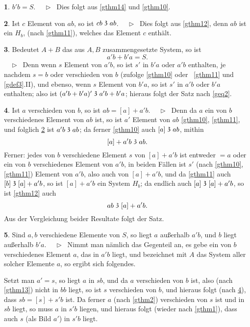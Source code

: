 \documentclass[leqno,hidelinks,10pt]{article}
\theoremstyle{definition}
\newtheorem{satz}{\protect\satzname}
\newcommand{\satzname}{}
\renewcommand{\satzname}{\hspace{-4pt}.\ Satz}%
\renewcommand{\satzname}{\hspace{-4pt}.\ Theorem}%
\newcommand\Beweis{\medskip \newline $ \phantom{'.'} \rhd \ $}%
\newcommand\beweis{ $ \phantom{'.'} \rhd \ $}%
\newcommand\TeilVon{\mathrel{\raisebox{0.45ex}{$\mathfrak{3}$}}}
\newcommand{\sref}[1]{\underline{\ref{#1}}}%
\begin{document}
\begin{paracol}{2}
\begin{leftcolumn}
\begin{satz}\label{gthm15}
$b' b = S$.
\Beweis
Dies folgt aus \sref{gthm14} und \sref{gthm10}.
\end{satz}

\begin{satz}\label{gthm16}
Ist $c$ Element von $ab$, so ist $cb \TeilVon ab$.
\Beweis
Dies folgt aus \sref{gthm12}, denn $ab$ ist ein $H_b$,
(nach \sref{gthm11}), welches das Element $c$ enthält.
\end{satz}

\begin{satz}\label{gthm17}
Bedeutet $A + B$ das aus $A, B$ zusammengesetzte System, so ist
\[
	a'b + b'a = S.
\]%
\beweis
Denn wenn $s$ Element von $a'b$, so ist $s'$ in $b'a$ oder $a'b$
enthalten, je nachdem $s = b$ oder verschieden von $b$ (zufolge \sref{gthm10}
oder ~\sref{gthm11} und \sref{gdef3}.II), und ebenso, wenn $s$ Element von
$b'a$, so ist $s'$ in $a'b$ oder $b'a$ enthalten; also ist
$(a'b + b'a)' \TeilVon a'b + b'a$; hieraus folgt der Satz nach \eqref{geq2}.
\end{satz}

\begin{satz}\label{gthm18}
Ist $a$ verschieden von $b$, so ist $ab = [a] + a'b$.
\Beweis
Denn da $a$ ein von $b$ verschiedenes Element von $ab$ ist, so ist $a'$ Element
von $ab$ \sref{gthm10}, \sref{gthm11}, und folglich \sref{gthm16} ist
$a'b \TeilVon ab$; da ferner \sref{gthm10} auch $[a] \TeilVon ab$, mithin
\[
	[a] + a'b \TeilVon ab.
\]
Ferner: jedes von $b$ verschiedene Element $s$ von $[a] + a'b$ ist entweder
$= a$ oder ein von $b$ verschiedenes Element von $a'b$, in beiden Fällen ist
$s'$ (nach \sref{gthm10}, \sref{gthm11}) Element von $a'b$, also auch von
$[a]+ a'b$, und da \sref{gthm11} auch $[b] \TeilVon [a] + a'b$, so ist
$[a] + a'b$ ein System $H_b$; da endlich auch $[a] \TeilVon [a] + a'b$, so ist
\sref{gthm12} auch
\[
	ab \TeilVon [a] + a' b.
\]
Aus der Vergleichung beider Resultate folgt der Satz.
\end{satz}

\newpage

\begin{satz}\label{gthm19}
Sind $a, b$ verschiedene Elemente von $S$, so liegt $a$ außerhalb $a'b$,
und $b$ liegt außerhalb $b'a$.
\Beweis
Nimmt man nämlich das Gegenteil an, es gebe ein von $b$ verschiedenes
Element $a$, das in $a'b$ liegt, und bezeichnet mit $A$ das System aller
solcher Elemente $a$, so ergibt sich folgendes.

Setzt man $a' = s$, so liegt $a$ in $sb$, und da $a$ verschieden von $b$ ist, also
(nach \sref{gthm13}) nicht in $bb$ liegt, so ist $s$ verschieden von $b$, und
hieraus folgt (nach \sref{gthm18}), dass $sb = [s] + s'b$ ist. Da ferner $a$
(nach \sref{gthm2}) verschieden von $s$ ist und in $sb$ liegt, so muss $a$ in
$s'b$ liegen, und hieraus folgt (wieder nach \sref{gthm1}), dass auch $s$
(als Bild $a'$) in $s'b$ liegt.


\end{satz}
\end{leftcolumn}
\end{paracol}
\end{document}
